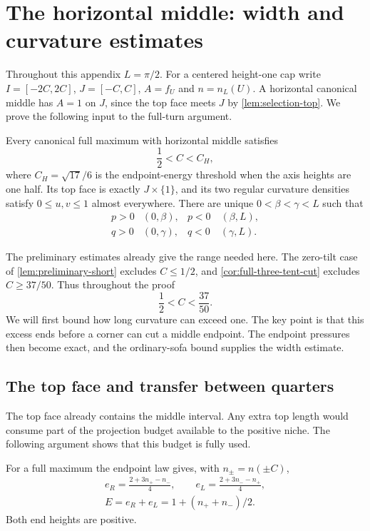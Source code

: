 \section{The horizontal middle: width and curvature estimates}
\label{app:horizontal-estimates}

Throughout this appendix $L=\pi/2$. For a centered height-one cap
write $I=[-2C,2C]$, $J=[-C,C]$, $A=f_U$ and $n=n_L(U)$.
A horizontal canonical middle has $A=1$ on $J$, since the top
face meets $J$ by \cref{lem:selection-top}. We prove the following
input to the full-turn argument.

\begin{lemma}\label{lem:full-horizontal-unit}
Every canonical full maximum with horizontal middle satisfies
\[
 \frac12<C<C_H,
\]
where $C_H=\sqrt{17}/6$ is the endpoint-energy threshold when the
axis heights are one half.
Its top face is exactly $J\times\{1\}$, and its two regular
curvature densities satisfy $0\le u,v\le1$ almost everywhere.
There are unique $0<\beta<\gamma<L$ such that
\[
 \begin{array}{lll}
 p>0&(0,\beta),&p<0\quad(\beta,L),\\
 q>0&(0,\gamma),&q<0\quad(\gamma,L).
 \end{array}
\]
\end{lemma}

The preliminary estimates already give the range needed here.
The zero-tilt case of \cref{lem:preliminary-short} excludes $C\le1/2$,
and \cref{cor:full-three-tent-cut} excludes $C\ge37/50$.
Thus throughout the proof
\[
 \frac12<C<\frac{37}{50}.
\]
We will first bound how long curvature can exceed one. The key point
is that this excess ends before a corner can cut a middle endpoint.
The endpoint pressures then become exact, and the ordinary-sofa
bound supplies the width estimate.

\subsection{The top face and transfer between quarters}

The top face already contains the middle interval. Any extra top length
would consume part of the projection budget available to the positive
niche. The following argument shows that this budget is fully used.

For a full maximum the endpoint law gives, with $n_\pm=n(\pm C)$,
\begin{equation}\label{eq:horizontal-pressure}
 \begin{gathered}
 e_R=\frac{2+3n_+-n_-}{4},\qquad
 e_L=\frac{2+3n_--n_+}{4},\\
 E=e_R+e_L=1+(n_++n_-)/2.
 \end{gathered}
\end{equation}
Both end heights are positive.

